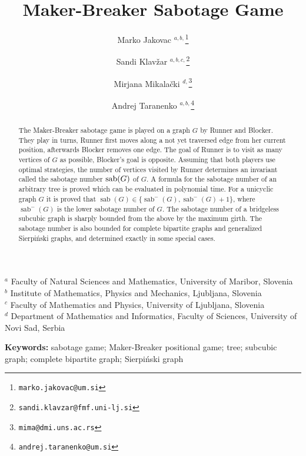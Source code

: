 \documentclass[12pt]{article}
\DeclareMathOperator{\sab}{\mathrm{sab}}
\begin{document}
\title{Maker-Breaker Sabotage Game}

\author{
Marko Jakovac 
$^{a,b,}$\thanks{\texttt{marko.jakovac@um.si}}
\and Sandi Klav\v zar $^{a,b,c,}$\thanks{\texttt{sandi.klavzar@fmf.uni-lj.si}}
\and Mirjana Mikala\v{c}ki $^{d,}$\thanks{\texttt{mima@dmi.uns.ac.rs}}
\and Andrej Taranenko $^{a,b,}$\thanks{\texttt{andrej.taranenko@um.si}}
}
\maketitle

\begin{center}
$^a$ Faculty of Natural Sciences and Mathematics, University of Maribor, Slovenia \\
\medskip
$^b$ Institute of Mathematics, Physics and Mechanics, Ljubljana, Slovenia\\
\medskip
$^c$ Faculty of Mathematics and Physics, University of Ljubljana, Slovenia\\
\medskip
$^d$ Department of Mathematics and Informatics, Faculty of Sciences, University of Novi Sad, Serbia\\
	\medskip
\end{center}

\begin{abstract}
The Maker-Breaker sabotage game is played on a graph $G$ by Runner and Blocker. They play in turns, Runner first moves along a not yet traversed edge from her current position, afterwards Blocker removes one edge. The goal of Runner is to visit as many vertices of $G$ as possible, Blocker's goal is opposite. Assuming that both players use optimal strategies, the number of vertices visited by Runner determines an invariant called the sabotage number ${\rm sab}(G)$ of $G$. 
A formula for the sabotage number of an arbitrary tree is proved which can be evaluated in polynomial time. For a unicyclic graph $G$ it is proved that $\sab(G)\in \{\sab^-(G), \sab^-(G)+1\}$, where $\sab^-(G)$ is the lower sabotage number of $G$. The sabotage number of a bridgeless subcubic graph is sharply bounded from the above by the maximum girth. The sabotage number is also bounded for complete bipartite graphs and generalized Sierpi\'nski graphs, and determined exactly in some special cases. 
\end{abstract}

\noindent
{\bf Keywords:} sabotage game; Maker-Breaker positional game; tree; subcubic graph; complete bipartite graph; Sierpi\'nski graph   \\
\end{document}
